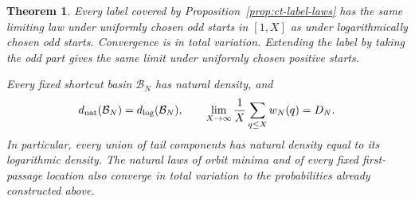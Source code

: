 \documentclass[11pt,a4paper]{article}
\newtheorem{theorem}{Theorem}
\begin{document}
\begin{theorem}\label{thm:ct-natural-density-upgrade}
Every label covered by Proposition~\ref{prop:ct-label-laws} has the
same limiting law under uniformly chosen odd starts in \([1,X]\)
as under logarithmically chosen odd starts. Convergence is in total
variation. Extending the label by taking the odd part gives the same
limit under uniformly chosen positive starts.

Every fixed shortcut basin \(\mathcal B_N\) has natural density,
and
\[
 d_{\rm nat}(\mathcal B_N)=d_{\log}(\mathcal B_N),\qquad
 \lim_{X\to\infty}\frac1X\sum_{q\le X}w_N(q)=D_N.
\]
In particular, every union of tail components has natural density
equal to its logarithmic density. The natural laws of orbit minima
and of every fixed first-passage location also converge in total
variation to the probabilities already constructed above.
\end{theorem}
\end{document}

